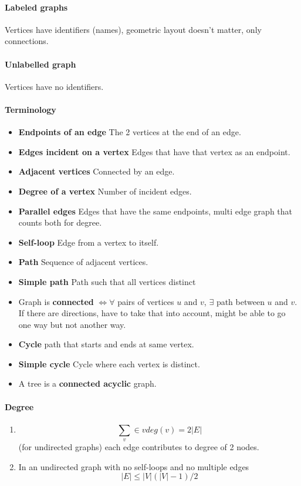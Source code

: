 \documentclass[12 pt]{article}
\theoremstyle{definition}
\begin{document}
        \paragraph{Labeled graphs} Vertices have identifiers (names), geometric layout doesn't matter, only connections.
        \paragraph{Unlabelled graph} Vertices have no identifiers.

\paragraph{Terminology}
\begin{itemize}
\item \textbf{Endpoints of an edge} The 2 vertices at the end of an edge.
\item \textbf{Edges incident on a vertex} Edges that have that vertex as an endpoint.
\item \textbf{Adjacent vertices} Connected by an edge.
\item \textbf{Degree of a vertex} Number of incident edges.
\item \textbf{Parallel edges} Edges that have the same endpoints, multi edge graph that counts both for degree.
\item \textbf{Self-loop} Edge from a vertex to itself.
\item \textbf{Path} Sequence of adjacent vertices.
\item \textbf{Simple path} Path such that all vertices distinct
\item Graph is \textbf{connected} $\iff \forall$ pairs of vertices $u$ and $v$, $\exists$ path between $u$ and $v$. If there are directions, have to take that into account, might be able to go one way but not another way.
\item \textbf{Cycle} path that starts and ends at same vertex.
\item \textbf{Simple cycle} Cycle where each vertex is distinct.
\item A tree is a \textbf{connected acyclic} graph.
\end{itemize}
\paragraph{Degree}
\begin{enumerate}
\item $$\sum_{v}\in v deg(v)=2|E|$$ (for undirected graphs) each edge contributes to degree of 2 nodes.
\item In an undirected graph with no self-loops and no multiple edges
  $$|E|\leq |V|(|V|-1)/2$$
\end{enumerate}
\end{document}
